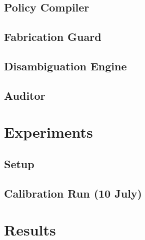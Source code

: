 \documentclass{article}
\begin{document}
\subsection{Policy Compiler}

\subsection{Fabrication Guard}

\subsection{Disambiguation Engine}

\subsection{Auditor}

\section{Experiments}

\subsection{Setup}

\subsection{Calibration Run (10 July)}

\section{Results}
\end{document}
